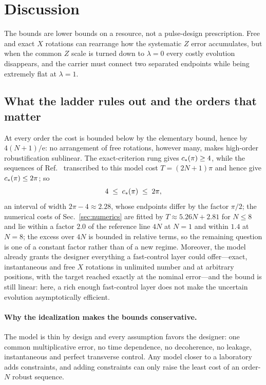 \section{Discussion}
\label{sec:discussion}

The bounds are lower bounds on a resource, not a pulse-design prescription. Free and
exact $X$ rotations can rearrange how the systematic $Z$ error accumulates, but when the
common $Z$ scale is turned down to $\lambda=0$ every costly evolution disappears, and the
carrier must connect two separated endpoints while being extremely flat at $\lambda=1$.

\subsection{What the ladder rules out and the orders that matter}

At every order the cost is bounded below by the
elementary bound, hence by $4(N+1)/\mathrm{e}$: no arrangement of free rotations, however many,
makes high-order robustification sublinear. The exact-criterion rung gives $c_*(\pi)\ge4$, while the sequences of
Ref.~\cite{Low2014} transcribed to this model cost $T=(2N+1)\pi$ and hence give
$c_*(\pi)\le2\pi$; so
\begin{equation}
4\;\le\;c_*(\pi)\;\le\;2\pi ,
\label{eq:window}
\end{equation}
an interval of width $2\pi-4\approx2.28$, whose endpoints differ by the factor $\pi/2$; the numerical costs of
Sec.~\ref{sec:numerics} are fitted by $T\approx5.26N+2.81$ for $N\le8$ and lie within a factor
$2.0$ of the reference line $4N$ at $N=1$ and within $1.4$ at $N=8$; the excess over $4N$ is
bounded in relative terms, so the remaining question is one of a constant factor rather than of
a new regime. Moreover, the model already grants the designer everything a fast-control layer could
offer---exact, instantaneous and free $X$ rotations in unlimited number and at arbitrary
positions, with the target reached exactly at the nominal error---and the bound is still linear:
here, a rich enough fast-control layer does not make the uncertain evolution asymptotically
efficient.

\paragraph{Why the idealization makes the bounds conservative.} The model is thin by design and every assumption favors the designer: one common multiplicative error, no time dependence, no decoherence, no leakage, instantaneous and perfect transverse control. Any model closer to a laboratory adds constraints, and adding constraints can only raise the least cost of an order-$N$ robust sequence.

